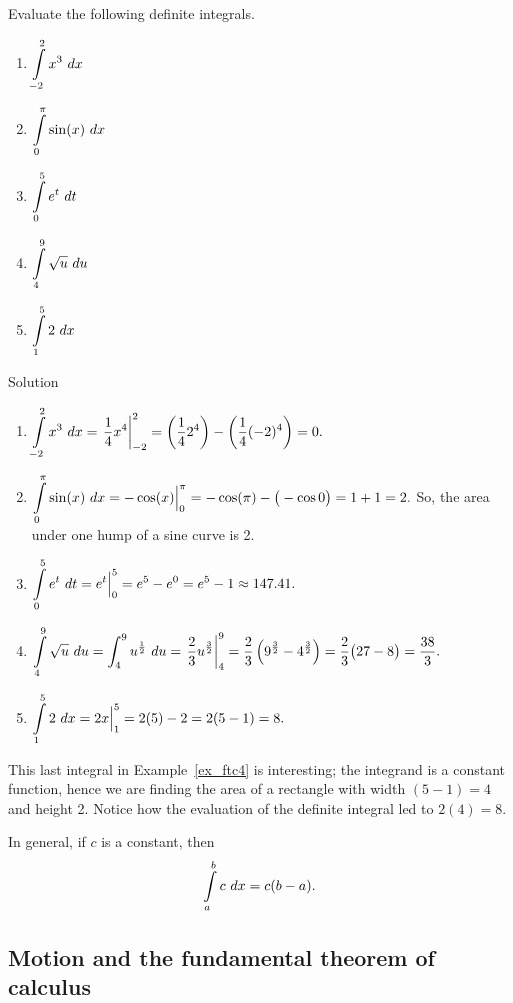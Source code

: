 \begin{example}\label{ex_ftc4}
Evaluate the following definite integrals.
\begin{multicols}{5}
\begin{enumerate}
\item	$\ds \int\limits_{-2}^2 x^3\ dx $
\item	$\ds \int\limits_0^\pi \sin (x)\ dx $ 
\item	$\ds \int\limits_0^5e^t\ dt$
\item	$\ds \int\limits_4^9 \sqrt{u}\ du $
\item	$\ds \int\limits_1^5 2\ dx $ 
\end{enumerate}
\end{multicols}



Solution 

\begin{enumerate}
\item	$\displaystyle \int\limits_{-2}^2 x^3\ dx = \left.\frac14x^4\right|_{-2}^2 = \left(\frac142^4\right) - \left(\frac14(-2)^4\right) = 0.$
\item		$\displaystyle \int\limits_0^\pi \sin (x)\ dx = -\cos (x)\Big|_0^\pi = -\cos (\pi)- \big(-\cos 0\big) = 1+1=2.$ So, the area under one hump of a sine curve is 2.
\item	 $\displaystyle \int\limits_0^5e^t\ dt = e^t\Big|_0^5 = e^5 - e^0 = e^5-1 \approx 147.41.$
\item		$\displaystyle \int\limits_4^9 \sqrt{u}\ du = \int_4^9 u^\frac12\ du = \left.\frac23u^\frac32\right|_4^9 = \frac23\left(9^\frac32-4^\frac32\right) = \frac23\big(27-8\big) =\frac{38}3.$
\item		$\displaystyle \int\limits_1^5 2\ dx = 2x\Big|_1^5 = 2(5)-2=2(5-1)=8.$ 

\end{enumerate}
\end{example}
This last integral in Example~\ref{ex_ftc4} is interesting; the integrand is a constant function, hence we are finding the area of a rectangle with width $(5-1)=4$ and height 2. Notice how the evaluation of the definite integral led to $2(4)=8$. 

In general, if $c$ is a constant, then 
$$\ds \int\limits_a^b c\ dx = c(b-a).$$

\subsection{Motion and the fundamental theorem of calculus}

